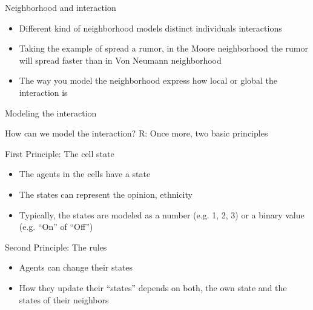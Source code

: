 \documentclass{beamer}
\begin{document}
\begin{frame}{Neighborhood and interaction}
\begin{itemize}
  \item Different kind of neighborhood models distinct individuals interactions
  \item Taking the example of spread a rumor, in the Moore neighborhood the rumor will spread faster than in Von Neumann neighborhood
  \item The way you model the neighborhood express how local or global the interaction is
\end{itemize}
\end{frame}

\begin{frame}{Modeling the interaction}
  \begin{beamerboxesrounded}[shadow=true]{How can we model the interaction?}
    R: Once more, two basic principles
  \end{beamerboxesrounded}
\end{frame}

\begin{frame}{First Principle: The cell state}
\begin{itemize}
  \item The agents in the cells have a state
  \item The states can represent the opinion, ethnicity
  \item Typically, the states are modeled as a number (e.g. 1, 2, 3) or a binary value (e.g. ``On'' of ``Off'')
\end{itemize}
\end{frame}

\begin{frame}{Second Principle: The rules}
\begin{itemize}
  \item Agents can change their states
  \item How they update their ``states'' depends on both, the own state and the states of their neighbors
\end{itemize}
\end{frame}
\end{document}

